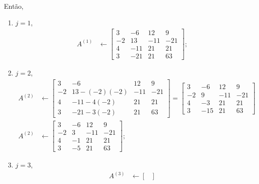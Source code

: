 \begin{questions}
\begin{solution}
        Ent\~{a}o,
        \begin{enumerate}
            \item $j = 1$,
                \begin{align*}
                    A^{(1)} &\leftarrow \begin{bmatrix}
                        3 & -6 & 12 & 9 \\
                        -2 & 13 & -11 & -21 \\
                        4 & -11 & 21 & 21 \\
                        3 & -21 & 21 & 63
                    \end{bmatrix};
                \end{align*}
            \item $j = 2$,
                \begin{align*}
                    A^{(2)} &\leftarrow \begin{bmatrix}
                        3 & -6 & 12 & 9 \\
                        -2 & 13 - (-2)(-2) & -11 & -21 \\
                        4 & -11 - 4(-2) & 21 & 21 \\
                        3 & -21 - 3(-2) & 21 & 63
                    \end{bmatrix} = \begin{bmatrix}
                        3 & -6 & 12 & 9 \\
                        -2 & 9 & -11 & -21 \\
                        4 & -3 & 21 & 21 \\
                        3 & -15 & 21 & 63
                    \end{bmatrix} \\
                    A^{(2)} &\leftarrow \begin{bmatrix}
                        3 & -6 & 12 & 9 \\
                        -2 & 3 & -11 & -21 \\
                        4 & -1 & 21 & 21 \\
                        3 & -5 & 21 & 63
                    \end{bmatrix};
                \end{align*}
           \item  $j = 3$,
               \begin{align*}
                   A^{(3)} &\leftarrow \begin{bmatrix}

\end{bmatrix}
\end{align*}
\end{enumerate}
\end{solution}
\end{questions}
